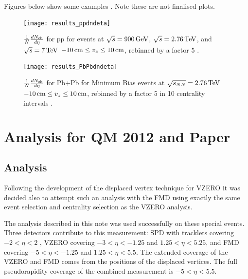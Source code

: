 \documentclass[11pt]{article}
\begin{document}
Figures below show some examples \cite{hhd:2009}.  Note these are not
finalised plots.
\begin{figure}[]
  \centering
  \texttt{[image: results\_ppdndeta]}
  \caption{$\dndeta$ for pp for \INEL{} events at
    $\sqrt{s}=\GeV{900}$, $\sqrt{s}=\TeV{2.76}$, and $\sqrt{s}=\TeV{7}$
    $\cm{-10}\le v_z\le\cm{10}$, rebinned by a factor 5 \cite{hhd:2009}. 
  }
  \label{fig:1}
\end{figure} 
\begin{figure}[]
  \centering
  \texttt{[image: results\_PbPbdndeta]}
  \caption{$\dndeta$ for Pb+Pb for Minimum Bias events at
    $\sqrt{s_{NN}}=\TeV{2.76}$ $\cm{-10}\le v_z\le\cm{10}$, rebinned by a
    factor 5 in 10 centrality intervals \cite{hhd:2009}. 
}
  \label{fig:2}
\end{figure} 


\clearpage

\section{Analysis for QM 2012 and Paper} \label{prelim}
\subsection{Analysis}

Following the development of the displaced vertex technique for VZERO
\cite{maxime} it was decided also to attempt such an analysis with the
FMD using exactly the same event selection and centrality selection as
the VZERO analysis.

The analysis described in this note was used successfully on these
special events. Three detectors contribute to this measurement: SPD
with tracklets covering $-2<\eta<2$ \cite{ruben,Aamodt:2010cz}, VZERO
covering $-3<\eta<-1.25$ and $1.25<\eta<5.25$, and FMD covering
$-5<\eta<-1.25$ and $1.25<\eta<5.5$. The extended coverage of the
VZERO and FMD comes from the positions of the displaced vertices. The
full pseudorapidity coverage of the combined measurement is
$-5<\eta<5.5$.
\end{document}
